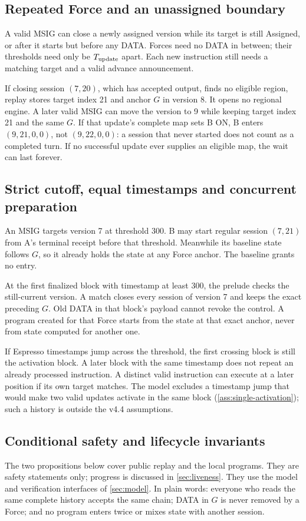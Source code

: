 \documentclass[11pt,a4paper]{article}
\begin{document}
\subsection{Repeated Force and an unassigned boundary}
\label{sec:repeated-force}
A valid MSIG can close a newly assigned version while its target is
still Assigned, or after it starts but before any DATA. Forces need no DATA
in between; their thresholds need only be $T_{\rm update}$ apart. Each
new instruction still needs a matching
target and a valid advance announcement.

If closing session $(7,20)$, which has accepted output, finds no eligible
region, replay stores target index 21 and anchor $G$ in version 8. It
opens no regional engine. A later valid MSIG can move the version to 9
while keeping target index 21 and the same $G$. If that update's complete
map sets B ON, B enters $(9,21,0,0)$, not $(9,22,0,0)$: a session that
never started does not count as a completed turn. If no successful update
ever supplies an eligible map, the wait can last forever.

\subsection{Strict cutoff, equal timestamps and concurrent preparation}
\label{sec:cutoff-example}
An MSIG targets version 7 at threshold 300. B may start regular session
$(7,21)$ from A's terminal receipt before that threshold. Meanwhile its
baseline state follows $G$, so it already holds the state at any Force
anchor. The baseline grants no entry.

At the first finalized block with timestamp at least 300, the prelude
checks the still-current version. A match closes every session of
version 7 and keeps the exact preceding $G$. Old DATA in that block's
payload cannot revoke the control. A program created for that
Force starts from the state at that exact anchor, never from state
computed for another one.

If Espresso timestamps jump across the threshold, the first crossing
block is still the activation block. A later block with the same
timestamp does not repeat an already processed instruction. A distinct
valid instruction can execute at a later position if its own target
matches. The model excludes a timestamp jump that would make two valid
updates activate in the same block (\cref{ass:single-activation}); such a
history is outside the v4.4 assumptions.

\subsection{Conditional safety and lifecycle invariants}
\label{sec:safety-argument}
The two propositions below cover public replay and the local programs.
They are safety statements only; progress is discussed in
\cref{sec:liveness}. They use the model and verification interfaces of
\cref{sec:model}. In plain words: everyone who reads the same complete
history accepts the same chain; DATA in $G$ is never removed by a Force;
and no program enters twice or mixes state with another session.
\end{document}

